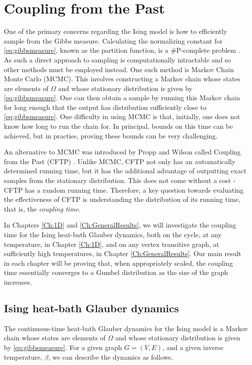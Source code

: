 \section{Coupling from the Past}
	One of the primary concerns regarding the Ising model is how to efficiently sample from the Gibbs measure. Calculating the normalizing constant for \eqref{eq:gibbsmeasure}, known as the partition function, is a \#P-complete problem \cite{Jerrum1993-ii}. As such a direct approach to sampling is computationally intractable and so other methods must be employed instead. One such method is Markov Chain Monte Carlo (MCMC). This involves constructing a Markov chain whose states are elements of $\Omega$ and whose stationary distribution is given by \eqref{eq:gibbsmeasure}. One can then obtain a sample by running this Markov chain for long enough that the output has distribution sufficiently close to \eqref{eq:gibbsmeasure}.
	One difficulty in using MCMC is that, initially, one does not know how long to run the chain for. In principal, bounds on this time can be achieved, but in practise, proving these bounds can be very challenging.

	An alternative to MCMC was introduced by Propp and Wilson called Coupling from the Past (CFTP) \cite{Propp1996-cf}. Unlike MCMC, CFTP not only has an automatically determined running time, but it has the additional advantage of outputting exact samples from the stationary distribution. This does not come without a cost - CFTP has a random running time. Therefore, a key question towards evaluating the effectiveness of CFTP is understanding the distribution of its running time, that is, the \emph{coupling time}.

	In Chapters \ref{Ch:1D} and \ref{Ch:GeneralResults}, we will investigate the coupling time for the Ising heat-bath Glauber dynamics, both on the cycle, at any temperature, in Chapter \ref{Ch:1D}, and on any vertex transitive graph, at sufficiently high temperatures, in Chapter \ref{Ch:GeneralResults}. Our main result in each chapter will be proving that, when appropriately scaled, the coupling time essentially converges to a Gumbel distribution as the size of the graph increases. 

	\subsection{Ising heat-bath Glauber dynamics}
	\label{sec:heat-bath glauber dynamics definition}
	The continuous-time heat-bath Glauber dynamics for the Ising model is a Markov chain whose states are elements of $\Omega$ and whose stationary distribution is given by \eqref{eq:gibbsmeasure}. For a given graph $G = (V, E)$, and a given inverse temperature, $\beta$, we can describe the dynamics as follows. 


